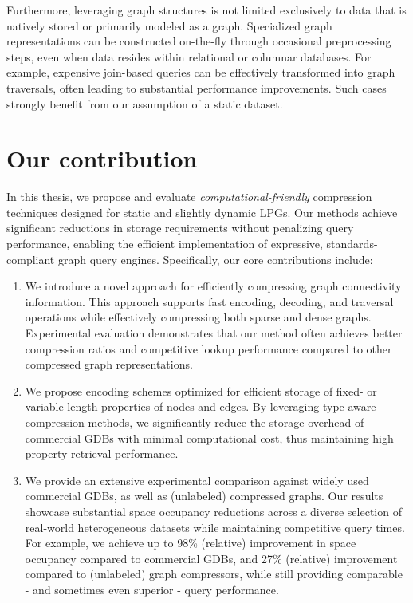 {Furthermore, leveraging graph structures is not limited exclusively to data that is natively stored or primarily modeled as a graph. Specialized graph representations can be constructed on-the-fly through occasional preprocessing steps, even when data resides within relational or columnar databases. For example, expensive join-based queries can be effectively transformed into graph traversals, often leading to substantial performance improvements. Such cases strongly benefit from our assumption of a static dataset.


\section{Our contribution}
In this thesis, we propose and evaluate \emph{computational-friendly} compression techniques designed for static and slightly dynamic LPGs. Our methods achieve significant reductions in storage requirements without penalizing query performance, enabling the efficient implementation of expressive, standards-compliant graph query engines. Specifically, our core contributions include:}

\begin{enumerate}
    \item We introduce a novel approach for efficiently compressing graph connectivity information. This approach supports fast encoding, decoding, and traversal operations while effectively compressing both sparse and dense graphs. Experimental evaluation demonstrates that our method often achieves better compression ratios and competitive lookup performance compared to other compressed graph representations.


    \item We propose encoding schemes optimized for efficient storage of fixed- or variable-length properties of nodes and edges. By leveraging type-aware compression methods, we significantly reduce the storage overhead of commercial GDBs with minimal computational cost, thus maintaining high property retrieval performance.
    
    \item We provide an extensive experimental comparison against widely used commercial GDBs, as well as (unlabeled) compressed graphs. Our results showcase substantial space occupancy reductions across a diverse selection of real-world heterogeneous datasets while maintaining competitive query times. For example, we achieve up to 98\% (relative) improvement in space occupancy compared to commercial GDBs, and 27\% (relative) improvement compared to (unlabeled) graph compressors, while still providing comparable - and sometimes even superior - query performance.
\end{enumerate}

